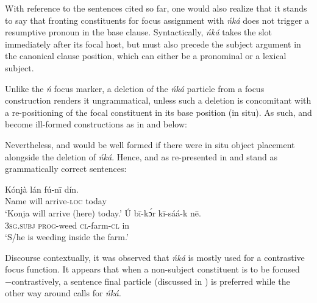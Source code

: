 \documentclass[output=paper,colorlinks,citecolor=brown]{langscibook}
\begin{document}
With reference to the sentences cited so far, one would also realize that it stands to say that fronting constituents for focus assignment with \textit{ńká} does not trigger a resumptive pronoun in the base clause. Syntactically,\textit{ ńká} takes the slot immediately after its focal host, but must also precede the subject argument in the canonical clause position, which can either be a pronominal or a lexical subject.

Unlike the \textit{ń} focus marker, a deletion of the \textit{ńká }particle from a focus construction renders it ungrammatical, unless such a deletion is concomitant with a re-positioning of the focal constituent in its base position (in situ). As such,  and  become ill-formed constructions as in  and  below:

\ea%
    \label{ex:bisilki:15}
    \z 
\z 

Nevertheless,  and  would be well formed if there were in situ object placement alongside the deletion of \textit{ńká}. Hence,  and  as re-presented in  and  stand as grammatically correct sentences:

\ea%
    \label{ex:bisilki:16}
    \ea\label{ex:bisilki:16a}
    \gll    Kónjà		lán	fú-nī		dín.\\
            Name		will	arrive\textsc{-loc}	today\\
    \glt    ‘Konja will arrive (here) today.’
    \ex\label{ex:bisilki:16b}
    \gll    Ú		bī-kɔ́r 		kī-sáá-k	nē.\\
            \textsc{3sg.subj}	\textsc{prog-}weed 		\textsc{cl-}farm\textsc{-cl}	in\\
    \glt    ‘S/he is weeding inside the farm.’
    \z
\z

Discourse contextually, it was observed that \textit{ńká } is mostly used for a contrastive focus function. It appears that when a non-subject constituent is to be focused −contrastively, a sentence final particle (discussed in ) is preferred while the other way around calls for \textit{ńká.}
\end{document}
